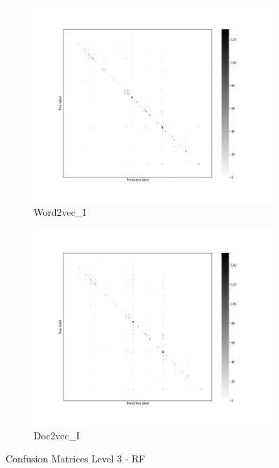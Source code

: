 \documentclass[12pt, a4paper, titlepage]{article}
\begin{document}
\begin{figure}
  \begin{subfigure}[b]{0.475\textwidth}   
    \centering 
    \includegraphics[width=\textwidth]{cm_word2vec_without_RF_3.jpg}
    {{\small Word2vec\_I}}    
  \end{subfigure}
  \hfill
  \begin{subfigure}[b]{0.475\textwidth}   
      \centering 
      \includegraphics[width=\textwidth]{cm_doc2vec_without_RF_3.jpg}
      {{\small Doc2vec\_I}}    
  \end{subfigure}
  \caption{\label{fig: F22} Confusion Matrices Level 3 - RF}
\end{figure}
\end{document}

